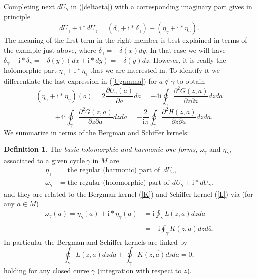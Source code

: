 \documentclass[reqno,12pt]{article}
\theoremstyle{plain}
\theoremstyle{definition}
\newtheorem{definition}{Definition}[section]
\numberwithin{equation}{section}
\numberwithin{figure}{section}
\def\I{\mathrm{i}}
\begin{document}
Completing next $dU_\gamma$ in (\ref{deltaeta}) with a corresponding imaginary part gives in principle
$$
dU_\gamma+\I *dU_\gamma =(\delta_\gamma +\I*\delta_\gamma)+ (\eta_\gamma+\I*\eta_\gamma).
$$
The meaning of the first term in the right member is best explained in terms of the example just above, 
where $\delta_\gamma=-\delta(x)dy$.
In that case we will have $\delta_\gamma+\I *\delta_\gamma=-\delta(y)(dx+\I*dy)=-\delta(y) dz$.
However, it is really the holomorphic part $\eta_\gamma+\I*\eta_\gamma$ that we are interested in. 
To identify it we differentiate the last expression in (\ref{Ugamma}) for $a\notin\gamma$ to obtain 
\begin{equation}\label{dUstardUH}
(\eta_\gamma +\I*\eta_\gamma)(a)=2\frac{\partial U_\gamma(a)}{\partial a}da
=-4\I\oint_\gamma\frac{\partial^2G(z,a)}{\partial z\partial a}dzda
\end{equation}
\begin{equation}\label{dUstardUH2}
=+4\I\oint_\gamma\frac{\partial^2G(z,a)}{\partial \bar{z}\partial a}d\bar{z}da
=-\frac{2}{\I\pi}{\oint_\gamma} \frac{\partial^2 H(z,a)}{\partial \bar{z}\partial {a}}d\bar{z}d{a}.
\end{equation}
We summarize in terms of the Bergman and Schiffer kernels:
\begin{definition}\label{def:omegagamma} 
The {\it basic holomorphic and harmonic one-forms}, $\omega_\gamma$ and $\eta_\gamma$, associated to a given cycle $\gamma$
in $M$ are  
\begin{align*}
\eta_\gamma&=\text{the regular (harmonic) part of } \, dU_\gamma,\\
\omega_\gamma&=\text{the regular (holomorphic) part of }\,  dU_\gamma+\I *dU_\gamma.
\end{align*}
and they are related to the Bergman kernel (\ref{K}) and Schiffer kernel (\ref{L}) via
(for any $a\in M$)
\begin{align}\label{omegaeta}
\omega_\gamma(a)=\eta_\gamma(a)+\I*\eta_\gamma(a)
&=\I \oint_\gamma L(z,a)dzda\\ 
&=-\I \oint_\gamma \overline{K(z,a)dzd\bar{a}}.
\end{align}
In particular the Bergman and Schiffer kernels are linked by
\begin{equation}\label{gammaLK}  
 \oint_\gamma L(z,a)dzda+\oint_\gamma \overline{K(z,a)dzd\bar{a}}=0,
\end{equation}
holding for any closed curve $\gamma$
(integration with respect to $z$).
\end{definition}
\end{document}
